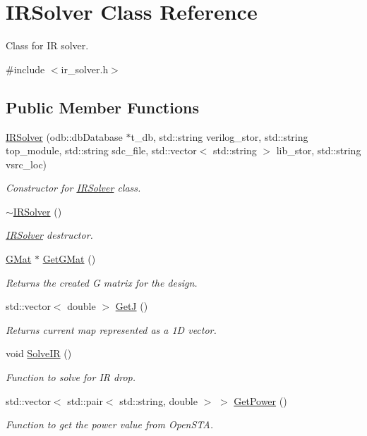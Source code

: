 \hypertarget{classIRSolver}{}\section{I\+R\+Solver Class Reference}
\label{classIRSolver}


Class for IR solver.  




{\ttfamily \#include $<$ir\+\_\+solver.\+h$>$}

\subsection*{Public Member Functions}
\begin{DoxyCompactItemize}
\item 
\hyperlink{classIRSolver_ade5e2e1c97895d8e9c37141f62eccbd9}{I\+R\+Solver} (odb\+::db\+Database $\ast$t\+\_\+db, std\+::string verilog\+\_\+stor, std\+::string top\+\_\+module, std\+::string sdc\+\_\+file, std\+::vector$<$ std\+::string $>$ lib\+\_\+stor, std\+::string vsrc\+\_\+loc)
\begin{DoxyCompactList}\small\item\em Constructor for \hyperlink{classIRSolver}{I\+R\+Solver} class. \end{DoxyCompactList}\item 
\hyperlink{classIRSolver_a3f8f596fc1314294c91650c9aea1b276}{$\sim$\+I\+R\+Solver} ()
\begin{DoxyCompactList}\small\item\em \hyperlink{classIRSolver}{I\+R\+Solver} destructor. \end{DoxyCompactList}\item 
\hyperlink{classGMat}{G\+Mat} $\ast$ \hyperlink{classIRSolver_a72b07b8b929136c0cac95077dce87990}{Get\+G\+Mat} ()
\begin{DoxyCompactList}\small\item\em Returns the created G matrix for the design. \end{DoxyCompactList}\item 
std\+::vector$<$ double $>$ \hyperlink{classIRSolver_a15a1b2f7bbbd71cd568e532bf03ce1b0}{GetJ} ()
\begin{DoxyCompactList}\small\item\em Returns current map represented as a 1D vector. \end{DoxyCompactList}\item 
void \hyperlink{classIRSolver_ad0c6ef5800e5892f441e11b57d19dcaf}{Solve\+IR} ()
\begin{DoxyCompactList}\small\item\em Function to solve for IR drop. \end{DoxyCompactList}\item 
std\+::vector$<$ std\+::pair$<$ std\+::string, double $>$ $>$ \hyperlink{classIRSolver_addd237968206ba6e1c875180eddd562f}{Get\+Power} ()
\begin{DoxyCompactList}\small\item\em Function to get the power value from Open\+S\+TA. \end{DoxyCompactList}\end{DoxyCompactItemize}
